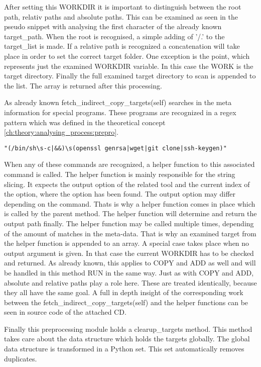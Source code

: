 After setting this WORKDIR it is important to distinguish between the root path, relativ paths and absolute paths. This can be examined as seen in the pseudo snippet with analysing the first character of the already known target\_path.
When the root is recognised, a simple adding of '/.' to the target\_list is made. If a relative path is recognized a concatenation will take place in order to set the correct target folder. One exception is the point, which represents just the examined WORKDIR variable. In this case the WORK is the target directory. 
Finally the full examined target directory to scan is appended to the list. The array is returned after this processing.

As already known fetch\_indirect\_copy\_targets(self) searches in the meta information for special programs. These programs are recognized in a regex pattern which was defined in the theoretical concept \ref{ch:theory:analysing_process:prepro}.
\begin{lstlisting}
"(/bin/sh\s-c|&&)\s(openssl genrsa|wget|git clone|ssh-keygen)"
\end{lstlisting}
When any of these commands are recognized, a helper function to this associated command is called. The helper function is mainly responsible for the string slicing.
It expects the output option of the related tool and the current index of the option, where the option has been found. The output option may differ depending on the command. Thats is why a helper function comes in place which is called by the parent method. The helper function will determine and return the output path finally.
The helper function may be called multiple times, depending of the amount of matches in the meta-data. That is why an examined target from the helper function is appended to an array. 
A special case takes place when no output argument is given. In that case the current WORKDIR has to be checked and returned. As already known, this applies to COPY and ADD as well and will be handled in this method RUN in the same way. Just as with COPY and ADD, absolute and relative paths play a role here. These are treated identically, because they all have the same goal.
A full in depth insight of the corresponding work between the fetch\_indirect\_copy\_targets(self) and the helper functions can be seen in source code of the attached CD.

Finally this preprocessing module holds a clearup\_targets method. This method takes care about the data structure which holds the targets globally. The global data structure is transformed in a Python set. This set automatically removes duplicates.
	
